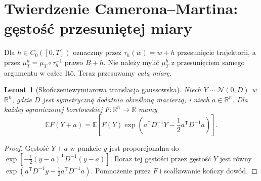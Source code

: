 \documentclass[11pt,a4paper,oneside]{report}
\numberwithin{equation}{chapter}
\theoremstyle{plain}
\newtheorem{lemat}[twierdzenie]{Lemat}
\theoremstyle{definition}
\theoremstyle{remark}
\newcommand{\R}{\mathbb{R}}
\newcommand{\E}{\mathbb{E}}
\newcommand{\Normal}{\mathcal{N}}
\begin{document}
\section{Twierdzenie Camerona--Martina: gęstość przesuniętej miary}

Dla $h\in C_0([0,T])$ oznaczmy przez $\tau_h(w)=w+h$
przesunięcie trajektorii, a przez
$\mu_T^h=\mu_T\circ\tau_h^{-1}$ prawo $B+h$.
Nie należy mylić $\mu_T^h$ z przesunięciem samego argumentu
w całce Itô. Teraz przesuwamy \emph{całą miarę}.

\begin{lemat}[Skończeniewymiarowa translacja gaussowska]
\label{lem:gauss-shift}
Niech $Y\sim\Normal(0,D)$ w $\R^n$, gdzie $D$ jest
symetryczną dodatnio określoną macierzą, i niech
$a\in\R^n$. Dla każdej ograniczonej borelowskiej
$F:\R^n\to\R$ mamy
\[
\E F(Y+a)=\E\left[F(Y)\exp\left(
 a^{\mathsf T}D^{-1}Y-\frac12a^{\mathsf T}D^{-1}a
\right)\right].
\]
\end{lemat}
\begin{proof}
Gęstość $Y+a$ w punkcie $y$ jest proporcjonalna do
$\exp[-\frac12(y-a)^{\mathsf T}D^{-1}(y-a)]$.
Iloraz tej gęstości przez gęstość $Y$ jest równy
$\exp(a^{\mathsf T}D^{-1}y-\frac12a^{\mathsf T}D^{-1}a)$.
Pomnożenie przez $F$ i scałkowanie kończy dowód.
\end{proof}
\end{document}
